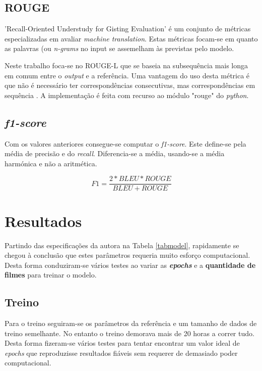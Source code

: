 \documentclass{article}
\begin{document}
\subsection{ROUGE}
'Recall-Oriented Understudy for Gisting Evaluation' é um conjunto de métricas especializadas em avaliar \textit{machine translation}. Estas métricas focam-se em quanto as palavras (ou \textit{n-grams} no input se assemelham às previstas pelo modelo.

Neste trabalho foca-se no ROUGE-L que se baseia na subsequência mais longa em comum entre o \textit{output} e a referência. Uma vantagem do uso desta métrica é que não é necessário ter correspondências consecutivas, mas correspondências em sequência \cite{rouge}. A implementação é feita com recurso ao módulo "rouge" do \textit{python}.

\subsection{\textit{f1-score}}
Com os valores anteriores consegue-se computar o \textit{f1-score}. Este define-se pela média de precisão e do \textit{recall}. Diferencia-se a média, usando-se a média harmónica e não a aritmética.

\begin{equation}
F1 = \frac{2*BLEU*ROUGE}{BLEU+ROUGE}
\end{equation}


\section{Resultados}

Partindo das especificações da autora na Tabela \ref{tabmodel}, rapidamente se chegou à conclusão que estes parâmetros requeria muito esforço computacional. Desta forma conduziram-se vários testes ao variar as \textbf{\textit{epochs}} e a \textbf{quantidade de filmes} para treinar o modelo.
\subsection{Treino}
Para o treino seguiram-se os parâmetros da referência \cite{abonia2020seq2seq} e um tamanho de dados de treino semelhante. No entanto o treino demorava mais de 20 horas a correr tudo. Desta forma fizeram-se vários testes para tentar encontrar um valor ideal de \textit{epochs} que reproduzisse resultados fiáveis sem requerer de demasiado poder computacional.
\end{document}
